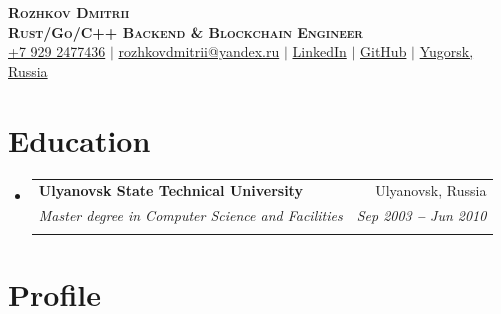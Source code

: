 \documentclass[letterpaper,11pt]{article}
\makeatletter
\newcommand{\resumeItem}[1]{
  \item\small{
    {#1 \vspace{-2pt}}
  }
}
\newcommand{\resumeEducationHeading}[6]{
  \vspace{-2pt}\item
    \begin{tabular*}{0.97\textwidth}[t]{l@{\extracolsep{\fill}}r}
      \textbf{#1} & #2 \\
      \textit{\small#3} & \textit{\small #4} \\
      \textit{\small#5} & \textit{\small #6} \\
    \end{tabular*}\vspace{-5pt}
}
\newcommand{\resumeSubHeadingListStart}{\begin{itemize}[leftmargin=0.15in, label={}]}
\newcommand{\resumeSubHeadingListEnd}{\end{itemize}}
\newcommand{\resumeItemListStart}{\begin{itemize}}
\newcommand{\resumeItemListEnd}{\end{itemize}\vspace{-5pt}}
\makeatother
\begin{document}

\begin{center}
    \textbf{\Huge \scshape Rozhkov Dmitrii} \\ \vspace{3pt}
    \textbf{\large \scshape Rust/Go/C++ Backend \& Blockchain Engineer} \\ \vspace{3pt}
    \small
    \faMobile \hspace{.5pt} \href{tel:79292477436}{+7 929 2477436}
    $|$
    \faAt \hspace{.5pt} \href{mailto:rozhkovdmitrii@yandex.ru}{rozhkovdmitrii@yandex.ru}
    $|$
    \faLinkedinSquare \hspace{.5pt} \href{https://www.linkedin.com/in/dmitrii-rozhkov-596041107/}{LinkedIn}
    $|$
    \faGithub \hspace{.5pt} \href{https://github.com/rozhkovdmitrii}{GitHub}
    $|$
    \faMapMarker \hspace{.5pt} \href{https://goo.gl/maps/CAPxEvSmreu9ZjjHA}{Yugorsk, Russia}
\end{center}




\section{Education}
  \vspace{3pt}
  \resumeSubHeadingListStart
    
    \resumeEducationHeading
      {Ulyanovsk State Technical University
      }{Ulyanovsk, Russia}
      {Master degree in Computer Science and Facilities }{Sep 2003 \textbf{--} Jun 2010}
      {}{}
    
    
  \resumeSubHeadingListEnd



  
\section{Profile}
\vspace{3pt}
\justifying
\setlength{\parindent}{10pt}
\end{document}
